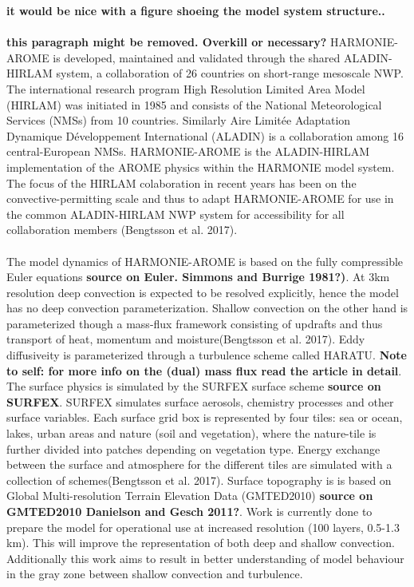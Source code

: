 \textbf{it would be nice with a figure shoeing the model system structure..}
\\
\\
\textbf{this paragraph might be removed. Overkill or necessary?}
HARMONIE-AROME is developed, maintained and validated through the shared ALADIN-HIRLAM system, a collaboration of 26 countries on short-range mesoscale NWP. The international research program High Resolution Limited Area Model (HIRLAM) was initiated in 1985 and consists of the National Meteorological Services (NMSs) from 10 countries. Similarly Aire Limitée Adaptation Dynamique Développement International (ALADIN) is a collaboration among 16 central-European NMSs. HARMONIE-AROME is the ALADIN-HIRLAM implementation of the AROME physics within the HARMONIE model system. The focus of the HIRLAM colaboration in recent years has been on the convective-permitting scale and thus to adapt HARMONIE-AROME for use in the common ALADIN-HIRLAM NWP system for accessibility for all collaboration members (Bengtsson et al. 2017)\cite{bengtsson_arome}.
\\
\\
The model dynamics of HARMONIE-AROME is based on the fully compressible Euler equations \textbf{source on Euler. Simmons and Burrige 1981?)}. At 3km resolution deep convection is expected to be resolved explicitly, hence the model has no deep convection parameterization. Shallow convection on the other hand is parameterized though a mass-flux framework consisting of updrafts and thus transport of heat, momentum and moisture(Bengtsson et al. 2017)\cite{bengtsson_arome}. Eddy diffusiveity is parameterized through a turbulence scheme called HARATU. \textbf{Note to self: for more info on the (dual) mass flux read the article in detail}. The surface physics is simulated by the SURFEX surface scheme \textbf{source on SURFEX}. SURFEX simulates surface aerosols, chemistry processes and other surface variables. Each surface grid box is represented by four tiles: sea or ocean, lakes, urban areas and nature (soil and vegetation), where the nature-tile is further divided into patches depending on vegetation type. Energy exchange between the surface and atmosphere for the different tiles are simulated with a collection of schemes(Bengtsson et al. 2017)\cite{bengtsson_arome}. Surface topography is is based on Global Multi-resolution Terrain Elevation Data (GMTED2010) \textbf{source on GMTED2010 Danielson and Gesch 2011?}. Work is currently done to prepare the model for operational use at increased resolution (100 layers, 0.5-1.3 km). This will improve the representation of both deep and shallow convection. Additionally this work aims to result in better understanding of model behaviour in the gray zone between shallow convection and turbulence.
